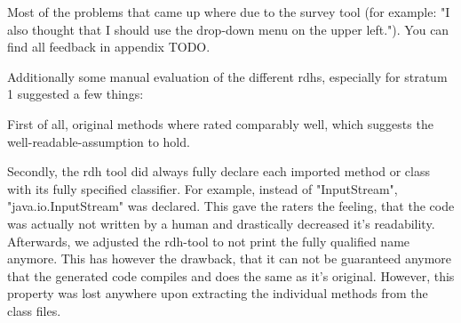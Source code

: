 \documentclass[%
class=scrreprt,
chapterprefix=false,%
open=right,%
twoside=false,%
paper=a4,%
logofile={Logo\_zentral\_farbig\_EN.png},%
thesistype=master,%
UKenglish,%
]{se2thesis}
\begin{document}
	Most of the problems that came up where due to the survey tool (for example: "I also thought that I should use the drop-down menu on the upper left."). You can find all feedback in appendix TODO.
	

	Additionally some manual evaluation of the different rdhs, especially for stratum 1 suggested a few things:
	
	First of all, original methods where rated comparably well, which suggests the well-readable-assumption to hold.
	
	Secondly, the rdh tool did always fully declare each imported method or class with its fully specified classifier. For example, instead of 
	"InputStream", "java.io.InputStream" was declared. This gave the raters the feeling, that the code was actually not written by a human and drastically decreased it's readability. Afterwards, we adjusted the rdh-tool to not print the fully qualified name anymore. This has however the drawback, that it can not be guaranteed anymore that the generated code compiles and does the same as it's original. However, this property was lost anywhere upon extracting the individual methods from the class files.
	
\end{document}
